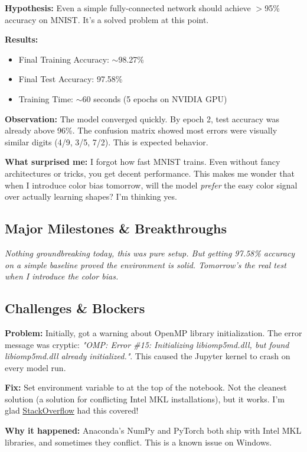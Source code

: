 \documentclass[9pt,a4paper,twocolumn,twoside]{tau-class/tau}
\begin{document}
        \textbf{Hypothesis:} Even a simple fully-connected network should achieve $>$95\% accuracy on MNIST. It's a solved problem at this point.
        
        \textbf{Results:}
        \begin{itemize}
            \item Final Training Accuracy: $\sim$98.27\%
            \item Final Test Accuracy: 97.58\%
            \item Training Time: $\sim$60 seconds (5 epochs on NVIDIA GPU)
        \end{itemize}
        
        \begin{note}
            \textbf{Observation:} The model converged quickly. By epoch 2, test accuracy was already above 96\%. The confusion matrix showed most errors were visually similar digits (4/9, 3/5, 7/2). This is expected behavior.
            
            \textbf{What surprised me:} I forgot how fast MNIST trains. Even without fancy architectures or tricks, you get decent performance. This makes me wonder that when I introduce color bias tomorrow, will the model \textit{prefer} the easy color signal over actually learning shapes? I'm thinking yes.
        \end{note}

    \subsection{Major Milestones \& Breakthroughs}
    
        \textit{Nothing groundbreaking today, this was pure setup. But getting 97.58\% accuracy on a simple baseline proved the environment is solid. Tomorrow's the real test when I introduce the color bias.}

    \subsection{Challenges \& Blockers}
    
        \begin{tauenv}[frametitle=Minor Issue: CUDA Setup]
            \textbf{Problem:} Initially, got a warning about OpenMP library initialization. The error message was cryptic: \textit{"OMP: Error \#15: Initializing libiomp5md.dll, but found libiomp5md.dll already initialized."}. This caused the Jupyter kernel to crash on every model run.
            
            \textbf{Fix:} Set environment variable  to  at the top of the notebook. Not the cleanest solution (a solution for conflicting Intel MKL installations), but it works. I'm glad \href{https://stackoverflow.com/questions/20554074/sklearn-omp-error-15-initializing-libiomp5md-dll-but-found-mk2iomp5md-dll-a}{StackOverflow} had this covered!
            
            \textbf{Why it happened:} Anaconda's NumPy and PyTorch both ship with Intel MKL libraries, and sometimes they conflict. This is a known issue on Windows.
        \end{tauenv}
        
\end{document}
